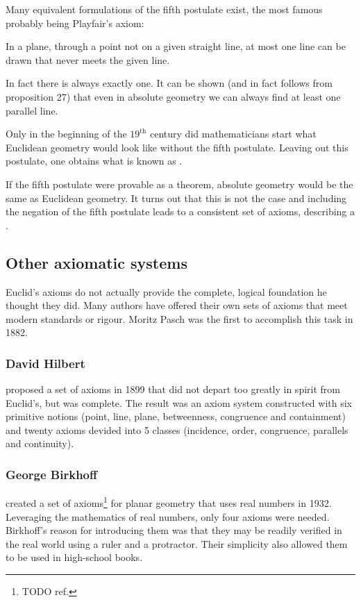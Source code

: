 Many equivalent formulations of the fifth postulate exist, the most famous probably being Playfair's axiom:

\begin{displayquote}
In a plane, through a point not on a given straight line, at most one line can be drawn that never meets the given line.
\end{displayquote}

In fact there is always exactly one. It can be shown (and in fact follows from proposition 27) that even in absolute geometry we can always find at least one parallel line.

Only in the beginning of the $19^\text{th}$ century did mathematicians start what Euclidean geometry would look like without the fifth postulate. Leaving out this postulate, one obtains what is known as .

If the fifth postulate were provable as a theorem, absolute geometry would be the same as Euclidean geometry. It turns out that this is not the case and including the negation of the fifth postulate leads to a consistent set of axioms, describing a .

\subsection{Other axiomatic systems}
Euclid's axioms do not actually provide the complete, logical foundation he thought they did. Many authors have offered their own sets of axioms that meet modern standards or rigour. Moritz Pasch was the first to accomplish this task in 1882.

\subsubsection{David Hilbert} proposed a set of axioms in 1899 that did not depart too greatly in spirit from Euclid's, but was complete. The result was an axiom system constructed with six primitive notions (point, line, plane, betweenness, congruence and containment) and twenty axioms devided into 5 classes (incidence, order, congruence, parallels and continuity).

\subsubsection{George Birkhoff} created a set of axioms\footnote{TODO ref.} for planar geometry that uses real numbers in 1932. Leveraging the mathematics of real numbers, only four axioms were needed. Birkhoff's reason for introducing them was that they may be readily verified in the real world using a ruler and a protractor. Their simplicity also allowed them to be used in high-school books.


